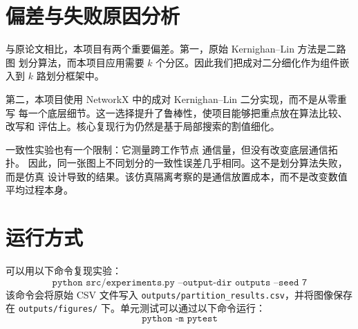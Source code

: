 \documentclass[UTF8, 11pt]{ctexart}
\begin{document}
\section{偏差与失败原因分析}

与原论文相比，本项目有两个重要偏差。第一，原始 Kernighan--Lin 方法是二路图
划分算法，而本项目应用需要 $k$ 个分区。因此我们把成对二分细化作为组件嵌入到
$k$ 路划分框架中。

第二，本项目使用 NetworkX 中的成对 Kernighan--Lin 二分实现，而不是从零重写
每一个底层细节。这一选择提升了鲁棒性，使项目能够把重点放在算法比较、改写和
评估上。核心复现行为仍然是基于局部搜索的割值细化。

一致性实验也有一个限制：它测量跨工作节点 通信量，但没有改变底层通信拓扑。
因此，同一张图上不同划分的一致性误差几乎相同。这不是划分算法失败，而是仿真
设计导致的结果。该仿真隔离考察的是通信放置成本，而不是改变数值平均过程本身。

\section{运行方式}

可以用以下命令复现实验：
\[
\texttt{python src/experiments.py --output-dir outputs --seed 7}
\]
该命令会将原始 CSV 文件写入
\texttt{outputs/partition\_results.csv}，并将图像保存在
\texttt{outputs/figures/} 下。单元测试可以通过以下命令运行：
\[
\texttt{python -m pytest}
\]
\end{document}
